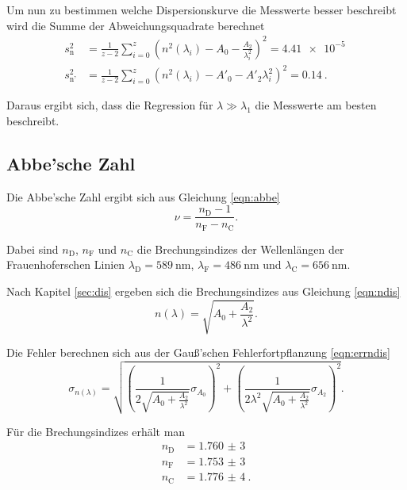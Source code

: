 Um nun zu bestimmen welche Dispersionskurve die Messwerte besser beschreibt wird die Summe der Abweichungsquadrate berechnet
\begin{align*}
  s^2_\text{n} &= \frac{1}{z-2} \sum_{i=0}^z \left(n^2(\lambda_i) - A_0 - \frac{A_2}{\lambda^2_i} \right)^2 = \SI{4,41e-5}{} \\
  s^2_\text{n'} &= \frac{1}{z-2} \sum_{i=0}^z \left(n^2(\lambda_i) - A'_0 - A'_2 \lambda^2_i \right)^2 = \SI{0,14}{}.
\end{align*}

Daraus ergibt sich, dass die Regression für $\lambda \gg \lambda_1$ die Messwerte am besten beschreibt.

\subsection{Abbe'sche Zahl \label{sec:abbe}}

Die Abbe'sche Zahl ergibt sich aus Gleichung \eqref{eqn:abbe}
\begin{equation}
  \nu = \frac{n_\text{D} - 1}{n_\text{F} - n_\text{C}}.
  \label{eqn:abbe}
\end{equation}

Dabei sind $n_\text{D}$, $n_\text{F}$ und $n_\text{C}$ die Brechungsindizes der Wellenlängen der Frauenhoferschen Linien $\lambda_\text{D} = \SI{589}{\nm}$,
$\lambda_\text{F} = \SI{486}{\nm}$ und $\lambda_\text{C} = \SI{656}{\nm}$.

Nach Kapitel \ref{sec:dis} ergeben sich die Brechungsindizes aus Gleichung \eqref{eqn:ndis}
\begin{equation}
  n(\lambda) = \sqrt{A_0 + \frac{A_2}{\lambda^2}}.
  \label{eqn:ndis}
\end{equation}

Die Fehler berechnen sich aus der Gauß'schen Fehlerfortpflanzung \eqref{eqn:errndis}
\begin{equation}
  \sigma_{n(\lambda)} = \sqrt{\left(\frac{1}{2 \sqrt{A_0 + \frac{A_2}{\lambda^2}}} \sigma_{A_0} \right)^2 + \left( \frac{1}{2 \lambda^2 \sqrt{A_0 + \frac{A_2}{\lambda^2}}} \sigma_{A_2} \right)^2}.
  \label{eqn:errndis}
\end{equation}

Für die Brechungsindizes erhält man
\begin{align*}
  n_\text{D} &= \SI{1,760(3)}{}\\
  n_\text{F} &= \SI{1,753(3)}{}\\
  n_\text{C} &= \SI{1,776(4)}{}.
\end{align*}

